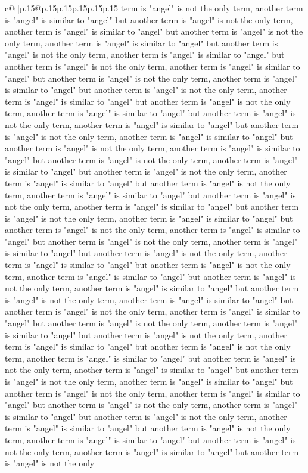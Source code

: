 \documentclass{article}
\begin{document}
{\begin{supertabular}{c@{$\;$}|p{.15\linewidth}@{}p{.15\linewidth}p{.15\linewidth}p{.15\linewidth}p{.15\linewidth}p{.15\linewidth}}
{{{term is "angel" is not the only term, another term is "angel" is similar to "angel" but another term is "angel" is not the only term, another term is "angel" is similar to "angel" but another term is "angel" is not the only term, another term is "angel" is similar to "angel" but another term is "angel" is not the only term, another term is "angel" is similar to "angel" but another term is "angel" is not the only term, another term is "angel" is similar to "angel" but another term is "angel" is not the only term, another term is "angel" is similar to "angel" but another term is "angel" is not the only term, another term is "angel" is similar to "angel" but another term is "angel" is not the only term, another term is "angel" is similar to "angel" but another term is "angel" is not the only term, another term is "angel" is similar to "angel" but another term is "angel" is not the only term, another term is "angel" is similar to "angel" but another term is "angel" is not the only term, another term is "angel" is similar to "angel" but another term is "angel" is not the only term, another term is "angel" is similar to "angel" but another term is "angel" is not the only term, another term is "angel" is similar to "angel" but another term is "angel" is not the only term, another term is "angel" is similar to "angel" but another term is "angel" is not the only term, another term is "angel" is similar to "angel" but another term is "angel" is not the only term, another term is "angel" is similar to "angel" but another term is "angel" is not the only term, another term is "angel" is similar to "angel" but another term is "angel" is not the only term, another term is "angel" is similar to "angel" but another term is "angel" is not the only term, another term is "angel" is similar to "angel" but another term is "angel" is not the only term, another term is "angel" is similar to "angel" but another term is "angel" is not the only term, another term is "angel" is similar to "angel" but another term is "angel" is not the only term, another term is "angel" is similar to "angel" but another term is "angel" is not the only term, another term is "angel" is similar to "angel" but another term is "angel" is not the only term, another term is "angel" is similar to "angel" but another term is "angel" is not the only term, another term is "angel" is similar to "angel" but another term is "angel" is not the only term, another term is "angel" is similar to "angel" but another term is "angel" is not the only term, another term is "angel" is similar to "angel" but another term is "angel" is not the only term, another term is "angel" is similar to "angel" but another term is "angel" is not the only term, another term is "angel" is similar to "angel" but another term is "angel" is not the only term, another term is "angel" is similar to "angel" but another term is "angel" is not the only term, another term is "angel" is similar to "angel" but another term is "angel" is not the only term, another term is "angel" is similar to "angel" but another term is "angel" is not the only term, another term is "angel" is similar to "angel" but another term is "angel" is not the only }}}
\end{supertabular}}
\end{document}
